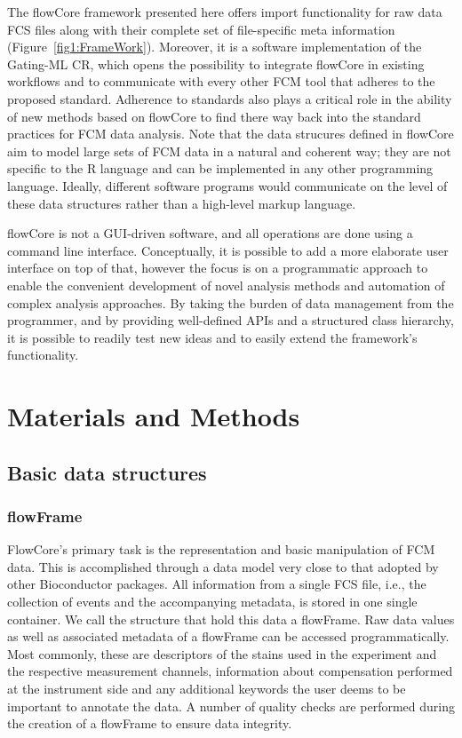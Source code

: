 \documentclass[12pt]{article}
\begin{document}
The flowCore framework presented here offers import functionality for
raw data FCS files along with their complete set of file-specific meta
information (Figure~\ref{fig1:FrameWork}). Moreover, it is a software
implementation of the Gating-ML CR, which opens the possibility to
integrate flowCore in existing workflows and to communicate with every
other FCM tool that adheres to the proposed standard. Adherence to
standards also plays a critical role in the ability of new methods
based on flowCore to find there way back into the standard practices
for FCM data analysis. Note that the data strucures defined in
flowCore aim to model large sets of FCM data in a natural and coherent
way; they are not specific to the R language and can be implemented in
any other programming language. Ideally, different software programs
would communicate on the level of these data structures rather than a
high-level markup language.

flowCore is not a GUI-driven software, and all operations are done
using a command line interface. Conceptually, it is possible to add a
more elaborate user interface on top of that, however the focus is on
a programmatic approach to enable the convenient development of novel
analysis methods and automation of complex analysis approaches. By
taking the burden of data management from the programmer, and by
providing well-defined APIs and a structured class hierarchy, it is
possible to readily test new ideas and to easily extend the
framework's functionality.



\section*{Materials and Methods}
\subsection*{Basic data structures}
\subsubsection*{flowFrame}
FlowCore's primary task is the representation and basic manipulation
of FCM data. This is accomplished through a data model very close to
that adopted by other Bioconductor packages. All information from a
single FCS file, i.e., the collection of events and the accompanying
metadata, is stored in one single container. We call the structure
that hold this data a flowFrame. Raw data values as well as associated
metadata of a flowFrame can be accessed programmatically. Most
commonly, these are descriptors of the stains used in the experiment
and the respective measurement channels, information about
compensation performed at the instrument side and any additional
keywords the user deems to be important to annotate the data. A number
of quality checks are performed during the creation of a flowFrame to
ensure data integrity.
\end{document}
